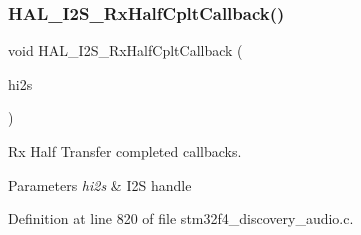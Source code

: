 \subsubsection{\texorpdfstring{H\+A\+L\+\_\+\+I2\+S\+\_\+\+Rx\+Half\+Cplt\+Callback()}{HAL\_I2S\_RxHalfCpltCallback()}}
{\footnotesize\ttfamily void H\+A\+L\+\_\+\+I2\+S\+\_\+\+Rx\+Half\+Cplt\+Callback (\begin{DoxyParamCaption}\item[{I2\+S\+\_\+\+Handle\+Type\+Def $\ast$}]{hi2s }\end{DoxyParamCaption})}



Rx Half Transfer completed callbacks. 


\begin{DoxyParams}{Parameters}
{\em hi2s} & I2S handle \\
\hline
\end{DoxyParams}


Definition at line 820 of file stm32f4\+\_\+discovery\+\_\+audio.\+c.

